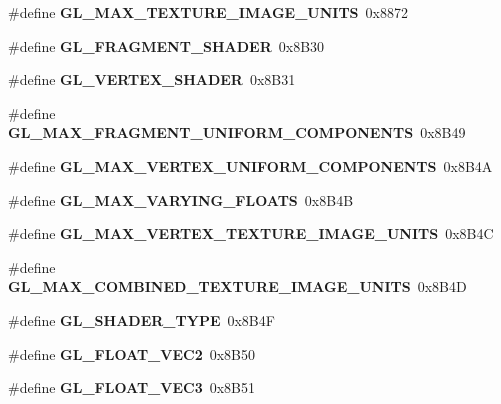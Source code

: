 \begin{DoxyCompactItemize}
\item 
\#define {\bfseries G\+L\+\_\+\+M\+A\+X\+\_\+\+T\+E\+X\+T\+U\+R\+E\+\_\+\+I\+M\+A\+G\+E\+\_\+\+U\+N\+I\+T\+S}~0x8872\label{_s_d_l__opengl_8h_aa1e280e2514abe7d70e7faea3566af6b}

\item 
\#define {\bfseries G\+L\+\_\+\+F\+R\+A\+G\+M\+E\+N\+T\+\_\+\+S\+H\+A\+D\+E\+R}~0x8\+B30\label{_s_d_l__opengl_8h_a1a0294662b50921555cae95fb20740d4}

\item 
\#define {\bfseries G\+L\+\_\+\+V\+E\+R\+T\+E\+X\+\_\+\+S\+H\+A\+D\+E\+R}~0x8\+B31\label{_s_d_l__opengl_8h_aceb29bc16e885f956eb9e351a7dd6276}

\item 
\#define {\bfseries G\+L\+\_\+\+M\+A\+X\+\_\+\+F\+R\+A\+G\+M\+E\+N\+T\+\_\+\+U\+N\+I\+F\+O\+R\+M\+\_\+\+C\+O\+M\+P\+O\+N\+E\+N\+T\+S}~0x8\+B49\label{_s_d_l__opengl_8h_a6ba6f2409d8bd8df147e09b0e3eb2820}

\item 
\#define {\bfseries G\+L\+\_\+\+M\+A\+X\+\_\+\+V\+E\+R\+T\+E\+X\+\_\+\+U\+N\+I\+F\+O\+R\+M\+\_\+\+C\+O\+M\+P\+O\+N\+E\+N\+T\+S}~0x8\+B4\+A\label{_s_d_l__opengl_8h_adf723a88758cec8f0d102e11d1a7cf09}

\item 
\#define {\bfseries G\+L\+\_\+\+M\+A\+X\+\_\+\+V\+A\+R\+Y\+I\+N\+G\+\_\+\+F\+L\+O\+A\+T\+S}~0x8\+B4\+B\label{_s_d_l__opengl_8h_af3bf01941a3298694c5b196bc0bdd514}

\item 
\#define {\bfseries G\+L\+\_\+\+M\+A\+X\+\_\+\+V\+E\+R\+T\+E\+X\+\_\+\+T\+E\+X\+T\+U\+R\+E\+\_\+\+I\+M\+A\+G\+E\+\_\+\+U\+N\+I\+T\+S}~0x8\+B4\+C\label{_s_d_l__opengl_8h_aa937c6648af59f9616f68dd4c7fdd787}

\item 
\#define {\bfseries G\+L\+\_\+\+M\+A\+X\+\_\+\+C\+O\+M\+B\+I\+N\+E\+D\+\_\+\+T\+E\+X\+T\+U\+R\+E\+\_\+\+I\+M\+A\+G\+E\+\_\+\+U\+N\+I\+T\+S}~0x8\+B4\+D\label{_s_d_l__opengl_8h_a97d4815b832e756dc3841617c5f4540e}

\item 
\#define {\bfseries G\+L\+\_\+\+S\+H\+A\+D\+E\+R\+\_\+\+T\+Y\+P\+E}~0x8\+B4\+F\label{_s_d_l__opengl_8h_aa4589f80c92f427cc4ed462223e28850}

\item 
\#define {\bfseries G\+L\+\_\+\+F\+L\+O\+A\+T\+\_\+\+V\+E\+C2}~0x8\+B50\label{_s_d_l__opengl_8h_ae32c545990d8412e8a8246632df99824}

\item 
\#define {\bfseries G\+L\+\_\+\+F\+L\+O\+A\+T\+\_\+\+V\+E\+C3}~0x8\+B51\label{_s_d_l__opengl_8h_a3bd312b25bbe841d5231ad69c4a0541a}


\end{DoxyCompactItemize}

